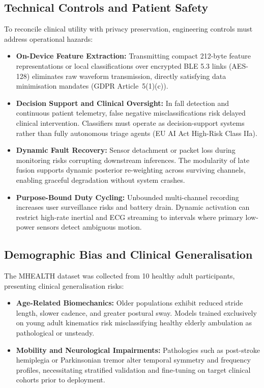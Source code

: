 \documentclass[10pt,twocolumn]{article}
\begin{document}
\subsection{Technical Controls and Patient Safety}
To reconcile clinical utility with privacy preservation, engineering controls must address operational hazards:
\begin{itemize}
    \item \textbf{On-Device Feature Extraction:} Transmitting compact 212-byte feature representations or local classifications over encrypted BLE 5.3 links (AES-128) eliminates raw waveform transmission, directly satisfying data minimisation mandates (GDPR Article~5(1)(c)).
    \item \textbf{Decision Support and Clinical Oversight:} In fall detection and continuous patient telemetry, false negative misclassifications risk delayed clinical intervention. Classifiers must operate as decision-support systems rather than fully autonomous triage agents (EU AI Act High-Risk Class IIa).
    \item \textbf{Dynamic Fault Recovery:} Sensor detachment or packet loss during monitoring risks corrupting downstream inferences. The modularity of late fusion supports dynamic posterior re-weighting across surviving channels, enabling graceful degradation without system crashes.
    \item \textbf{Purpose-Bound Duty Cycling:} Unbounded multi-channel recording increases user surveillance risks and battery drain. Dynamic activation can restrict high-rate inertial and ECG streaming to intervals where primary low-power sensors detect ambiguous motion.
\end{itemize}

\subsection{Demographic Bias and Clinical Generalisation}
The MHEALTH dataset was collected from 10 healthy adult participants, presenting clinical generalisation risks:
\begin{itemize}
    \item \textbf{Age-Related Biomechanics:} Older populations exhibit reduced stride length, slower cadence, and greater postural sway. Models trained exclusively on young adult kinematics risk misclassifying healthy elderly ambulation as pathological or unsteady.
    \item \textbf{Mobility and Neurological Impairments:} Pathologies such as post-stroke hemiplegia or Parkinsonian tremor alter temporal symmetry and frequency profiles, necessitating stratified validation and fine-tuning on target clinical cohorts prior to deployment.
\end{itemize}
\end{document}
